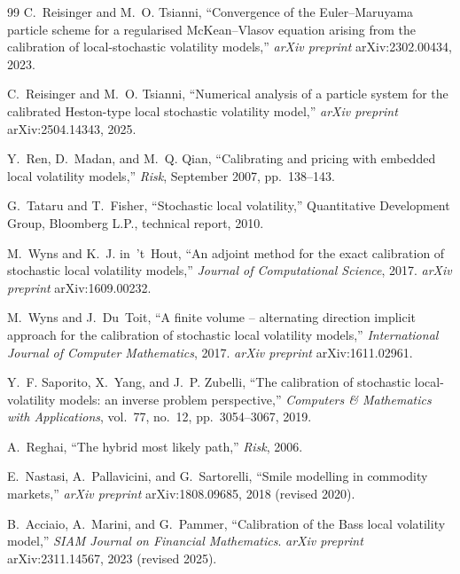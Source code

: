 \documentclass[11pt,a4paper]{article}
\theoremstyle{plain}
\theoremstyle{definition}
\theoremstyle{definition}
\begin{document}
\begin{thebibliography}{99}
 C.~Reisinger and M.~O. Tsianni, ``Convergence of the Euler--Maruyama particle scheme for a regularised McKean--Vlasov equation arising from the calibration of local-stochastic volatility models,'' \textit{arXiv preprint} arXiv:2302.00434, 2023.

 C.~Reisinger and M.~O. Tsianni, ``Numerical analysis of a particle system for the calibrated Heston-type local stochastic volatility model,'' \textit{arXiv preprint} arXiv:2504.14343, 2025.

 Y.~Ren, D.~Madan, and M.~Q. Qian, ``Calibrating and pricing with embedded local volatility models,'' \textit{Risk}, September 2007, pp.~138--143.

 G.~Tataru and T.~Fisher, ``Stochastic local volatility,'' Quantitative Development Group, Bloomberg L.P., technical report, 2010.

 M.~Wyns and K.~J. in~'t~Hout, ``An adjoint method for the exact calibration of stochastic local volatility models,'' \textit{Journal of Computational Science}, 2017. \textit{arXiv preprint} arXiv:1609.00232.

 M.~Wyns and J.~Du~Toit, ``A finite volume -- alternating direction implicit approach for the calibration of stochastic local volatility models,'' \textit{International Journal of Computer Mathematics}, 2017. \textit{arXiv preprint} arXiv:1611.02961.

 Y.~F. Saporito, X.~Yang, and J.~P. Zubelli, ``The calibration of stochastic local-volatility models: an inverse problem perspective,'' \textit{Computers \& Mathematics with Applications}, vol.~77, no.~12, pp.~3054--3067, 2019.

 A.~Reghai, ``The hybrid most likely path,'' \textit{Risk}, 2006.

 E.~Nastasi, A.~Pallavicini, and G.~Sartorelli, ``Smile modelling in commodity markets,'' \textit{arXiv preprint} arXiv:1808.09685, 2018 (revised 2020).

 B.~Acciaio, A.~Marini, and G.~Pammer, ``Calibration of the Bass local volatility model,'' \textit{SIAM Journal on Financial Mathematics}. \textit{arXiv preprint} arXiv:2311.14567, 2023 (revised 2025).


\end{thebibliography}
\end{document}
